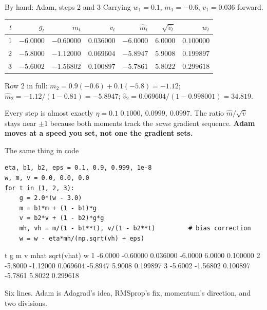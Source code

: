 \documentclass[aspectratio=169]{beamer}
\begin{document}
\begin{frame}[shrink=7]{By hand: Adam, steps 2 and 3}
  Carrying $w_1 = 0.1$, $m_1 = -0.6$, $v_1 = 0.036$ forward.
  \begin{center}\small
  \begin{tabular}{@{}rrrrrrr@{}}
    \toprule
    $t$ & $g_t$ & $m_t$ & $v_t$ & $\hat m_t$ & $\sqrt{\hat v_t}$ & $w_t$\\
    \midrule
    1 & $-6.0000$ & $-0.60000$ & $0.036000$ & $-6.0000$ & $6.0000$ & $0.100000$\\
    2 & $-5.8000$ & $-1.12000$ & $0.069604$ & $-5.8947$ & $5.9008$ & $0.199897$\\
    3 & $-5.6002$ & $-1.56802$ & $0.100897$ & $-5.7861$ & $5.8022$ & $0.299618$\\
    \bottomrule
  \end{tabular}
  \end{center}
  \vspace{0.2em}
  Row 2 in full: $m_2 = 0.9(-0.6) + 0.1(-5.8) = -1.12$;\;
  $\hat m_2 = -1.12/(1-0.81) = -5.8947$;\;
  $\hat v_2 = 0.069604/(1-0.998001) = 34.819$.
  \vspace{0.2em}
  \begin{alertblock}{Every step is almost exactly $\eta = 0.1$}
    \small $0.1000,\ 0.0999,\ 0.0997$. The ratio $\hat m/\sqrt{\hat v}$ stays
    near $\pm1$ because both moments track the \emph{same} gradient sequence.
    \textbf{Adam moves at a speed you set, not one the gradient sets.}
  \end{alertblock}
\end{frame}

\begin{frame}[fragile,shrink=3]{The same thing in code}
\begin{lstlisting}
eta, b1, b2, eps = 0.1, 0.9, 0.999, 1e-8
w, m, v = 0.0, 0.0, 0.0
for t in (1, 2, 3):
    g = 2.0*(w - 3.0)
    m = b1*m + (1 - b1)*g
    v = b2*v + (1 - b2)*g*g
    mh, vh = m/(1 - b1**t), v/(1 - b2**t)         # bias correction
    w = w - eta*mh/(np.sqrt(vh) + eps)
\end{lstlisting}
\begin{outblk}
  t         g          m          v       mhat  sqrt(vhat)          w
  1   -6.0000   -0.60000   0.036000    -6.0000      6.0000   0.100000
  2   -5.8000   -1.12000   0.069604    -5.8947      5.9008   0.199897
  3   -5.6002   -1.56802   0.100897    -5.7861      5.8022   0.299618
\end{outblk}
\begin{center}\small
  Six lines. Adam is Adagrad's idea, RMSprop's fix, momentum's direction, and
  two divisions.
\end{center}
\end{frame}
\end{document}
